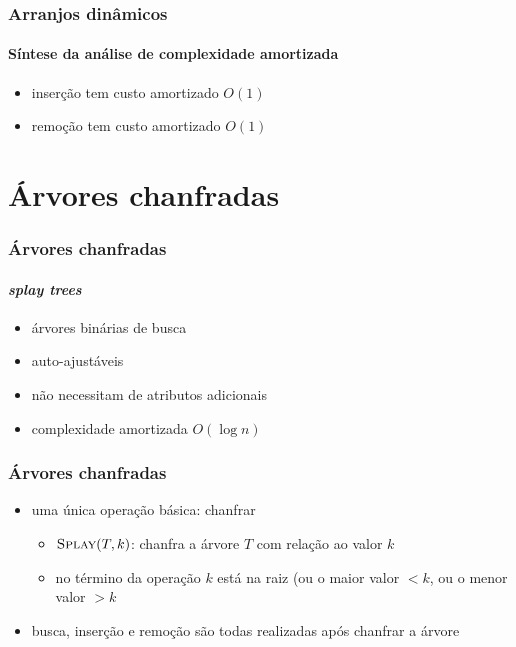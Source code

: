 \documentclass{beamer}
\begin{document}
\begin{frame}
\frametitle{Arranjos dinâmicos}
\framesubtitle{Síntese da análise de complexidade amortizada}
\begin{itemize}
  \item inserção tem custo amortizado $O(1)$
  \item remoção tem custo amortizado $O(1)$
\end{itemize}
\end{frame}

\section{Árvores chanfradas}

\begin{frame}
\frametitle{Árvores chanfradas}
\framesubtitle{\it splay trees}

\begin{itemize}
\item árvores binárias de busca
\item auto-ajustáveis
\item não necessitam de atributos adicionais
\item complexidade amortizada $O(\log n)$
\end{itemize}
\end{frame}

\begin{frame}
\frametitle{Árvores chanfradas}

\begin{itemize}
\item uma única operação básica: chanfrar
\begin{itemize}
\item $\textnormal{\scshape Splay}(T, k)$: chanfra a árvore $T$ com relação ao valor $k$
\item no término da operação $k$ está na raiz (ou o maior valor $< k$,
ou o menor valor $> k$
\end{itemize}
\item busca, inserção e remoção são todas realizadas após chanfrar a árvore
\end{itemize}
\end{frame}
\end{document}
